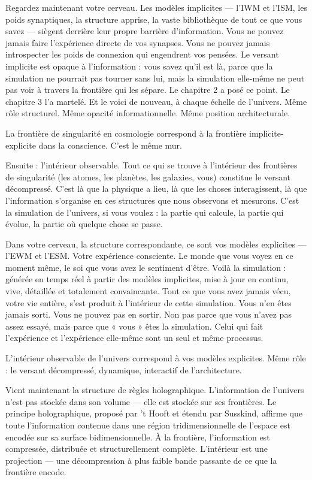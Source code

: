 \documentclass[11pt, twoside, openright]{book}
\begin{document}
Regardez maintenant votre cerveau. Les modèles implicites --- l'IWM et l'ISM, les poids synaptiques, la structure apprise, la vaste bibliothèque de tout ce que vous savez --- siègent derrière leur propre barrière d'information. Vous ne pouvez jamais faire l'expérience directe de vos synapses. Vous ne pouvez jamais introspecter les poids de connexion qui engendrent vos pensées. Le versant implicite est opaque à l'information : vous savez qu'il est là, parce que la simulation ne pourrait pas tourner sans lui, mais la simulation elle-même ne peut pas voir à travers la frontière qui les sépare. Le chapitre 2 a posé ce point. Le chapitre 3 l'a martelé. Et le voici de nouveau, à chaque échelle de l'univers. Même rôle structurel. Même opacité informationnelle. Même position architecturale.

La frontière de singularité en cosmologie correspond à la frontière implicite-explicite dans la conscience. C'est le même mur.

Ensuite : l'intérieur observable. Tout ce qui se trouve à l'intérieur des frontières de singularité (les atomes, les planètes, les galaxies, vous) constitue le versant décompressé. C'est là que la physique a lieu, là que les choses interagissent, là que l'information s'organise en ces structures que nous observons et mesurons. C'est la simulation de l'univers, si vous voulez : la partie qui calcule, la partie qui évolue, la partie où quelque chose se passe.

Dans votre cerveau, la structure correspondante, ce sont vos modèles explicites --- l'EWM et l'ESM. Votre expérience consciente. Le monde que vous voyez en ce moment même, le soi que vous avez le sentiment d'être. Voilà la simulation : générée en temps réel à partir des modèles implicites, mise à jour en continu, vive, détaillée et totalement convaincante. Tout ce que vous avez jamais vécu, votre vie entière, s'est produit à l'intérieur de cette simulation. Vous n'en êtes jamais sorti. Vous ne pouvez pas en sortir. Non pas parce que vous n'avez pas assez essayé, mais parce que « vous » êtes la simulation. Celui qui fait l'expérience et l'expérience elle-même sont un seul et même processus.

L'intérieur observable de l'univers correspond à vos modèles explicites. Même rôle : le versant décompressé, dynamique, interactif de l'architecture.

Vient maintenant la structure de règles holographique. L'information de l'univers n'est pas stockée dans son volume --- elle est stockée sur ses frontières. Le principe holographique, proposé par 't Hooft et étendu par Susskind, affirme que toute l'information contenue dans une région tridimensionnelle de l'espace est encodée sur sa surface bidimensionnelle. À la frontière, l'information est compressée, distribuée et structurellement complète. L'intérieur est une projection --- une décompression à plus faible bande passante de ce que la frontière encode.
\end{document}
